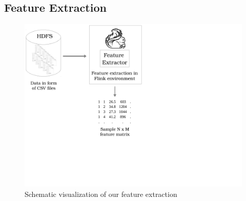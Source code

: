 \documentclass{vldb}
\begin{document}
\subsection{Feature Extraction}
\label{subsec:Metho-feature}

\begin{figure}
\centering
\includegraphics[trim=0cm 5.8cm 11.7cm 0cm, clip=true, width=0.8\linewidth]{"pics/approach1"}
\caption{Schematic visualization of our feature extraction}
\label{fig:approach-1}
\end{figure}
\end{document}
